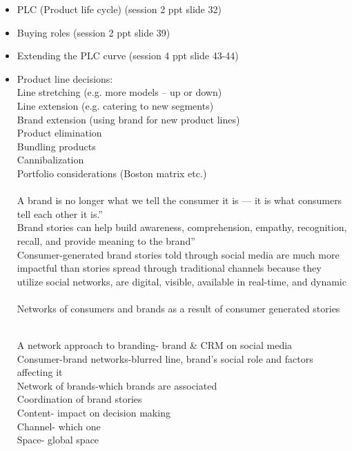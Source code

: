 \begin{itemize}  

\item 
PLC (Product life cycle) (session 2 ppt slide 32)
\item 
Buying roles (session 2 ppt slide 39) 
\item 
Extending the PLC curve (session 4 ppt slide 43-44)
\item
Product line decisions:
\\Line stretching (e.g. more models – up or down)
\\Line extension (e.g. catering to new segments)
\\Brand extension (using brand for new product lines)
\\Product elimination
\\Bundling products
\\Cannibalization
\\Portfolio considerations (Boston matrix etc.) 
\\\\
A brand is no longer what we tell the consumer it is — it is what consumers tell each other it is.”
\\
Brand stories can help build awareness, comprehension, empathy, recognition, recall, and provide meaning to the brand”
\\
Consumer-generated brand stories told through social media are much more impactful than stories spread through traditional channels because they utilize social networks, are digital, visible, available in real-time, and dynamic
\\\\
Networks of consumers and brands as a result of consumer generated stories

\\A network approach to branding- brand & CRM on social media
\\Consumer-brand networks-blurred line, brand’s social role and factors affecting it
\\Network of brands-which brands are associated
\\Coordination of brand stories
\\Content- impact on decision making
\\Channel- which one
\\Space- global space


\end{itemize}
